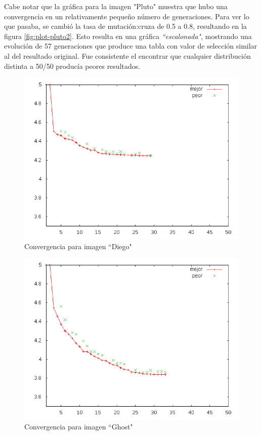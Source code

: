 Cabe notar que la gráfica para la imagen "Pluto" muestra que hubo una
convergencia en un relativamente pequeño número de generaciones. Para ver lo
que pasaba, se cambió la tasa de mutación:cruza de 0.5 a 0.8, resultando en la
figura \ref{fig:plot-pluto2}. Esto resulta en una gráfica
\emph{``escalonada"}, mostrando una evolución de 57 generaciones que produce una
tabla con valor de selección similar al del resultado original. Fue consistente
el encontrar que cualquier distribución distinta a 50/50 producía peores
resultados.

\begin{figure}[h]
    \includegraphics[width=1.0\textwidth]{plot_diego}
    \caption{Convergencia para imagen ``Diego"}
    \label{img:plot-diego}
\end{figure}

\begin{figure}[h]
    \includegraphics[width=1.0\textwidth]{plot_ghost}
    \caption{Convergencia para imagen ``Ghost"}
    \label{img:plot-ghost}
\end{figure}

